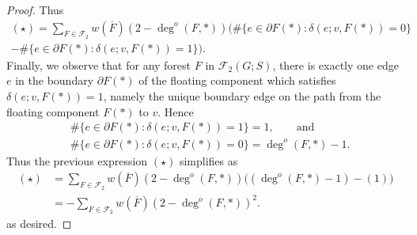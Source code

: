 \documentclass{amsart}
\theoremstyle{definition}
\newcommand{\forests}{\mathcal{F}}
\newcommand{\degout}{\deg^o}
\begin{document}
\begin{proof}
Thus
\begin{multline}
	(\star) = \sum_{F \in \forests_2} w(\overline{F}) (2 - \degout(F,*))  \Bigg( \#\{e \in \partial F(*) : \delta(e; v, F(*)) = 0 \}  \\
	- \#\{e \in \partial F(*) : \delta(e; v, F(*)) = 1 \}  \Bigg).
\end{multline}
Finally, we observe that for any forest $F$ in $\forests_2(G;S)$,
there is exactly one edge $e$ in the boundary $\partial F(*)$ of the floating component which satisfies $\delta(e; v, F(*)) = 1$, namely the unique boundary edge on the path from the floating component $F(*)$ to $v$.
Hence
\begin{align*}
	&\#\{e \in \partial F(*) : \delta(e;v, F(*)) = 1 \} = 1,
\qquad\text{and}\qquad \\
	&\#\{e \in \partial F(*) : \delta(e;v, F(*)) = 0 \} = \degout(F,*) - 1 .
\end{align*}
Thus the previous expression $(\star)$ simplifies as
\begin{align*}
	(\star) &= \sum_{F \in \forests_2} w(\overline{F}) (2 - \degout(F,*))  \Big( (\degout(F,*) - 1)  - (1) \Big) \\
	&= - \!\sum_{F \in \forests_2} w(\overline{F}) (2 - \degout(F,*))^2 .
\end{align*}
as desired.
\end{proof}
\end{document}
